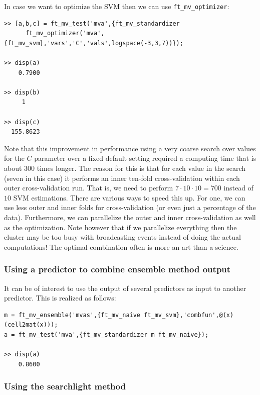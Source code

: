 \documentclass{article}
\renewcommand{\t}[1]{{\tt #1}}
\begin{document}
In case we want to optimize the SVM then we can use \t{ft\_mv\_optimizer}:
\begin{verbatim}
>> [a,b,c] = ft_mv_test('mva',{ft_mv_standardizer 
      ft_mv_optimizer('mva',{ft_mv_svm},'vars','C','vals',logspace(-3,3,7))});

>> disp(a)
    0.7900

>> disp(b)
     1

>> disp(c)
  155.8623
\end{verbatim}
Note that this improvement in performance using a very coarse search over values for the $C$ parameter  over a fixed default setting required a computing time that is about  300 times longer. The reason for this is that for each value in the search (seven in this case) it performs an inner ten-fold cross-validation within each outer cross-validation run. That is, we need to perform $7 \cdot 10 \cdot 10=700$ instead of $10$ SVM estimations. There are various ways to speed this up. For one, we can use less outer and inner folds for cross-validation (or even just a percentage of the data). Furthermore, we can parallelize the outer and inner cross-validation as well as the optimization. Note however that if we parallelize everything then the cluster may be too busy with broadcasting events instead of doing the actual computations! The optimal combination often is more an art than a science.

\subsubsection*{Using a predictor to combine ensemble method output}
It can be of interest to use the output of several predictors as input to another predictor. This is realized as follows:
\begin{verbatim}
m = ft_mv_ensemble('mvas',{ft_mv_naive ft_mv_svm},'combfun',@(x)(cell2mat(x)));
a = ft_mv_test('mva',{ft_mv_standardizer m ft_mv_naive});

>> disp(a)
    0.8600
\end{verbatim}

\subsubsection*{Using the searchlight method}
\end{document}
